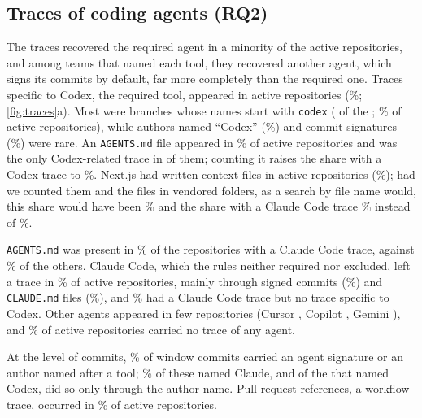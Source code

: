 \documentclass{article}
\begin{document}
\subsection{Traces of coding agents (RQ2)}\label{sec:traces}

The traces recovered the required agent in a minority of the active repositories, and among teams that named each tool, they recovered another agent, which signs its commits by default, far more completely than the required one. Traces specific to Codex, the required tool, appeared in \NRqTwoTracesCodexSpecificN{} active repositories (\NRqTwoTracesCodexSpecificPct\%; \cref{fig:traces}a). Most were branches whose names start with \texttt{codex} (\NRqTwoTracesCodexBranchN{} of the \NRqTwoTracesCodexSpecificN; \NRqTwoTracesCodexBranchPct\% of active repositories), while authors named ``Codex'' (\NRqTwoTracesCodexNamePct\%) and commit signatures (\NRqTwoTracesCodexSignaturePct\%) were rare. An \texttt{AGENTS.md} file appeared in \NRqTwoTracesCodexFilePct\% of active repositories and was the only Codex-related trace in \NRqTwoTracesCodexFileOnlyN{} of them; counting it raises the share with a Codex trace to \NRqTwoTracesCodexAnyPct\%. Next.js had written context files in \NRqTwoTracesContextExcludedNextjsN{} active repositories (\NRqTwoTracesContextExcludedNextjsPct\%); had we counted them and the files in vendored folders, as a search by file name would, this share would have been \NRqTwoTracesContextExcludedCodexAnyWithThemPct\% and the share with a Claude Code trace \NRqTwoTracesContextExcludedClaudeAnyWithThemPct\% instead of \NRqTwoTracesClaudeAnyPct\%.

\texttt{AGENTS.md} was present in \NRqTwoTracesAgentsMdWithClaudePct\% of the repositories with a Claude Code trace, against \NRqTwoTracesAgentsMdWithoutClaudePct\% of the others. Claude Code, which the rules neither required nor excluded, left a trace in \NRqTwoTracesClaudeAnyPct\% of active repositories, mainly through signed commits (\NRqTwoTracesClaudeSignaturePct\%) and \texttt{CLAUDE.md} files (\NRqTwoTracesClaudeFilePct\%), and \NRqTwoTracesClaudeNotCodexSpecificPct\% had a Claude Code trace but no trace specific to Codex. Other agents appeared in few repositories (Cursor \NRqTwoTracesCursorAnyN, Copilot \NRqTwoTracesCopilotAnyN, Gemini \NRqTwoTracesGeminiAnyN), and \NRqTwoTracesNoTracePct\% of active repositories carried no trace of any agent.

At the level of commits, \NRqTwoTracesSignedCommitsPct\% of window commits carried an agent signature or an author named after a tool; \NRqTwoTracesSignedCommitsClaudeShare\% of these named Claude, and of the \NRqTwoTracesSignedCommitsByKindCodex{} that named Codex, \NRqTwoTracesSignedCommitsCodexNamedOnly{} did so only through the author name. Pull-request references, a workflow trace, occurred in \NRqTwoTracesPrRefsPct\% of active repositories.
\end{document}
